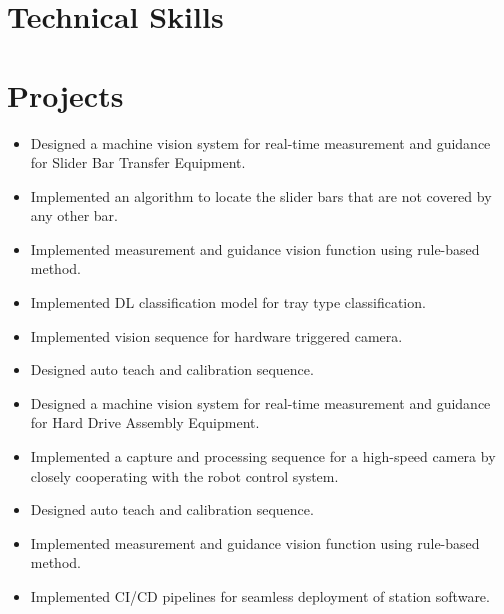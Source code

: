 \documentclass[11pt,a4paper,sans]{moderncv}
\begin{document}

\section{Technical Skills}


\section{Projects}
\begin{itemize}
    \item Designed a machine vision system for real-time measurement and guidance for Slider Bar Transfer Equipment.
    \item Implemented an algorithm to locate the slider bars that are not covered by any other bar.
    \item Implemented measurement and guidance vision function using rule-based method.
    \item Implemented DL classification model for tray type classification.
    \item Implemented vision sequence for hardware triggered camera.
    \item Designed auto teach and calibration sequence.
\end{itemize}

\begin{itemize}
    \item Designed a machine vision system for real-time measurement and guidance for Hard Drive Assembly Equipment.
    \item Implemented a capture and processing sequence for a high-speed camera by closely cooperating with the robot control system.
    \item Designed auto teach and calibration sequence.
    \item Implemented measurement and guidance vision function using rule-based method.
    \item Implemented CI/CD pipelines for seamless deployment of station software.
\end{itemize}
\end{document}
